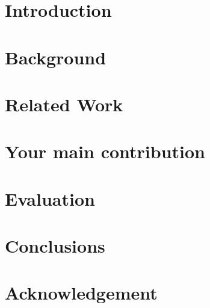 \documentclass[a4paper,11pt]{report}
\newenvironment{poliabstract}[1]
  {\renewcommand{\abstractname}{#1}\begin{abstract}}
  {\end{abstract}}
\begin{document}
\newpage\null\thispagestyle{empty}\newpage



\newpage\null\thispagestyle{empty}\newpage


\begin{poliabstract}{Abstract}
To be completed.
\end{poliabstract}

\newpage\null\thispagestyle{empty}\newpage

\tableofcontents
\listoffigures
\listoftables

\chapter{Introduction}
    

\chapter{Background}
\label{ch:background}


\chapter{Related Work}
\label{ch:relwork}


\chapter{Your main contribution}\label{ch:framework}


\chapter{Evaluation}\label{ch:eval}


\chapter{Conclusions}\label{ch:conclusions}
    



\chapter*{Acknowledgement}

    


\end{document}
